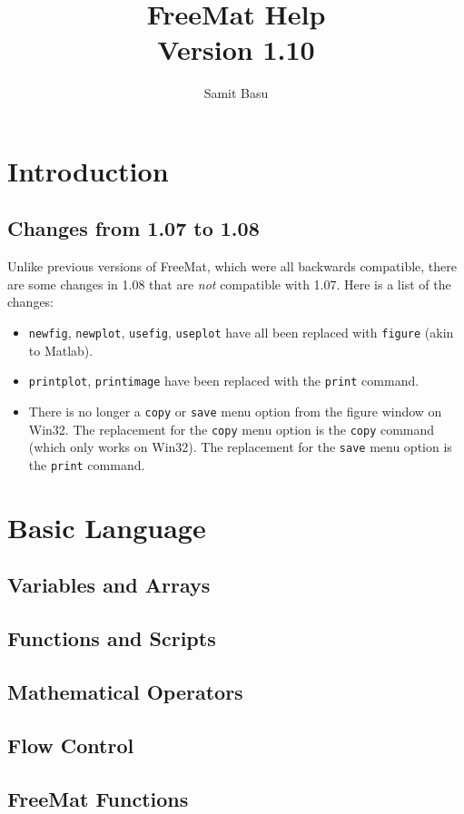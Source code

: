 \documentclass{book}
\title{FreeMat Help\\Version 1.10}
\author{Samit Basu}
\begin{document}
\maketitle
\tableofcontents
\chapter{Introduction}
\section{Changes from 1.07 to 1.08}
Unlike previous versions of FreeMat, which were all backwards compatible, there are some changes in 1.08 that are \emph{not} compatible with 1.07.  Here is a list of the changes:
\begin{itemize}
\item \verb|newfig|, \verb|newplot|, \verb|usefig|, \verb|useplot| have all been replaced with \verb|figure| (akin to Matlab).
\item \verb|printplot|, \verb|printimage| have been replaced with the \verb|print| command.
\item There is no longer a \verb|copy| or \verb|save| menu option from the figure window on Win32.  The replacement for the \verb|copy| menu option is the \verb|copy| command (which only works on Win32).  The replacement for the \verb|save| menu option  is the \verb|print| command.
\end{itemize}
\chapter{Basic Language}
\section{Variables and Arrays}

\section{Functions and Scripts}

\section{Mathematical Operators}

\section{Flow Control}

\section{FreeMat Functions}

\end{document}
